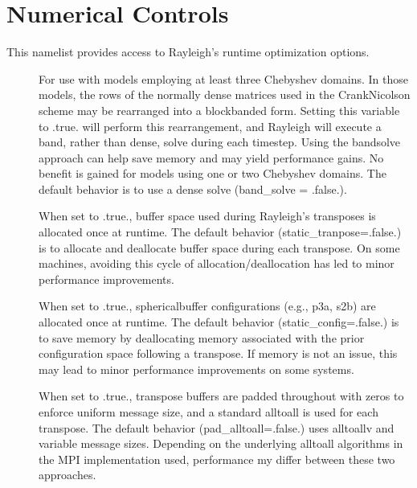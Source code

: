 \documentclass[letterpaper,11pt,english]{sphinxmanual}
\begin{document}
\section{Numerical Controls}
\label{\detokenize{doc/source/Namelist_Definitions/Namelist_Variables:numerical-controls}}
\sphinxAtStartPar
This namelist provides access to Rayleigh’s run\sphinxhyphen{}time optimization options.
\begin{description}
\item[{}] \leavevmode
\sphinxAtStartPar
For use with models employing at least three Chebyshev domains.  In those models, the rows of the normally dense matrices used in the Crank\sphinxhyphen{}Nicolson scheme may be rearranged into a block\sphinxhyphen{}banded form.  Setting this variable to .true. will perform this rearrangement, and Rayleigh will execute a band, rather than dense, solve during each timestep.  Using the band\sphinxhyphen{}solve approach can help save memory and may yield performance gains.  No benefit is gained for models using one or two Chebyshev domains.  The default behavior is to use a dense solve (band\_solve = .false.).

\item[{}] \leavevmode
\sphinxAtStartPar
When set to .true., buffer space used during Rayleigh’s transposes is allocated once at runtime.  The default behavior (static\_tranpose=.false.) is to allocate and deallocate buffer space during each transpose.  On some machines, avoiding this cycle of allocation/deallocation has led to minor performance improvements.

\item[{}] \leavevmode
\sphinxAtStartPar
When set to .true., sphericalbuffer configurations (e.g., p3a, s2b) are allocated once at runtime.  The default behavior (static\_config=.false.) is to save memory by deallocating memory associated with the prior configuration space following a transpose.  If memory is not an issue, this may lead to minor performance improvements on some systems.

\item[{}] \leavevmode
\sphinxAtStartPar
When set to .true., transpose buffers are padded throughout with zeros to enforce uniform message size, and a standard alltoall is used for each transpose.  The default behavior (pad\_alltoall=.false.) uses alltoallv and variable message sizes.  Depending on the underlying alltoall algorithms in the MPI implementation used, performance my differ between these two approaches.

\end{description}
\end{document}
